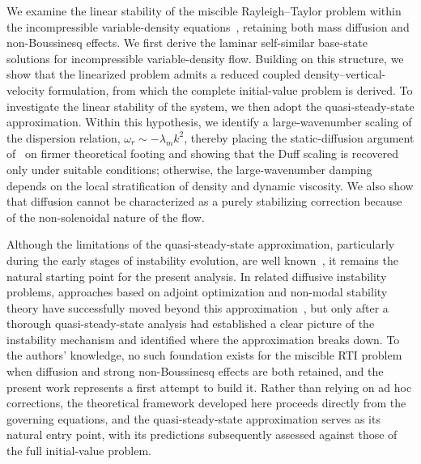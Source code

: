 \documentclass[11pt]{article}
\begin{document}
We examine the linear stability of the miscible Rayleigh--Taylor problem within the incompressible variable-density equations~\citep{sandoval-1995}, retaining both mass diffusion and non-Boussinesq effects. We first derive the laminar self-similar base-state solutions for incompressible variable-density flow. Building on this structure, we show that the linearized problem admits a reduced coupled density--vertical-velocity formulation, from which the complete initial-value problem is derived. To investigate the linear stability of the system, we then adopt the quasi-steady-state approximation. Within this hypothesis, we identify a large-wavenumber scaling of the dispersion relation, \(\omega_r \sim -\lambda_m k^2\), thereby placing the static-diffusion argument of~\citet{duff-harlow-hirt-1962} on firmer theoretical footing and showing that the Duff scaling is recovered only under suitable conditions; otherwise, the large-wavenumber damping depends on the local stratification of density and dynamic viscosity. We also show that diffusion cannot be characterized as a purely stabilizing correction because of the non-solenoidal nature of the flow.


Although the limitations of the quasi-steady-state approximation, particularly during the early
stages of instability evolution, are well known~\citep{tan-homsy-1986,riaz-et-al-2006,trevelyan-almarcha-wit-2011}, it remains the natural starting point for the present analysis. In related diffusive instability problems, approaches based on adjoint optimization and non-modal stability theory have successfully moved beyond this approximation~\citep{rapaka-et-al-2008,don-nils-amir-2013,prathama-pantano-2021}, but only after a thorough quasi-steady-state analysis had established a clear picture of the instability mechanism and identified where the approximation breaks down. To the authors' knowledge, no such foundation exists for the miscible RTI problem when diffusion and strong non-Boussinesq effects are both retained, and the present work represents a first attempt to build it. Rather than relying on ad hoc corrections, the theoretical framework developed here proceeds directly from the governing equations, and the quasi-steady-state approximation serves as its natural entry point, with its predictions subsequently assessed against those of the full initial-value problem.
\end{document}
